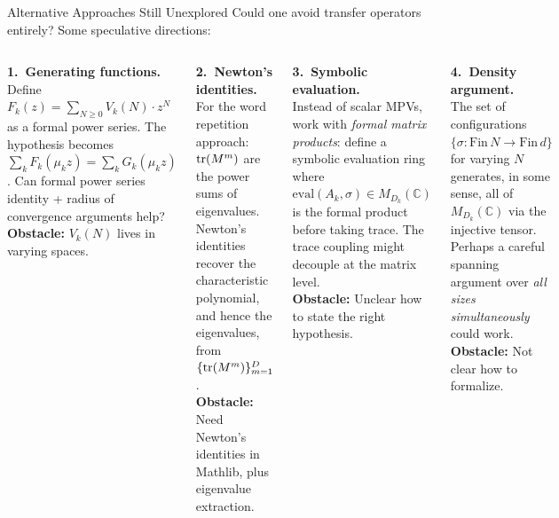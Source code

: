 \documentclass[aspectratio=169,10pt]{beamer}
\begin{document}
\begin{frame}{Alternative Approaches Still Unexplored}
\vspace{-0.3em}
{\small Could one avoid transfer operators entirely? Some speculative directions:}

\vspace{0.3em}
\begin{columns}[T]
{\small\textbf{\textcolor{amber}{1.\ Generating functions.}}}\\[0.1em]
{\scriptsize Define $F_k(z) = \sum_{N \geq 0} V_k(N) \cdot z^N$ as a formal power series. The hypothesis becomes $\sum_k F_k(\mu_k z) = \sum_k G_k(\mu_k z)$. Can formal power series identity + radius of convergence arguments help?\\[0.1em]
\textbf{Obstacle:} $V_k(N)$ lives in varying spaces.}

\vspace{0.3em}
{\small\textbf{\textcolor{amber}{2.\ Newton's identities.}}}\\[0.1em]
{\scriptsize For the word repetition approach: $\mathrm{tr}(M^m)$ are the power sums of eigenvalues. Newton's identities recover the characteristic polynomial, and hence the eigenvalues, from $\{\mathrm{tr}(M^m)\}_{m=1}^{D}$.\\[0.1em]
\textbf{Obstacle:} Need Newton's identities in Mathlib, plus eigenvalue extraction.}

{\small\textbf{\textcolor{amber}{3.\ Symbolic evaluation.}}}\\[0.1em]
{\scriptsize Instead of scalar MPVs, work with \emph{formal matrix products}: define a symbolic evaluation ring where $\mathrm{eval}(A_k, \sigma) \in M_{D_k}(\mathbb{C})$ is the formal product before taking trace. The trace coupling might decouple at the matrix level.\\[0.1em]
\textbf{Obstacle:} Unclear how to state the right hypothesis.}

\vspace{0.3em}
{\small\textbf{\textcolor{amber}{4.\ Density argument.}}}\\[0.1em]
{\scriptsize The set of configurations $\{\sigma : \mathrm{Fin}\,N \to \mathrm{Fin}\,d\}$ for varying $N$ generates, in some sense, all of $M_{D_k}(\mathbb{C})$ via the injective tensor. Perhaps a careful spanning argument over \emph{all sizes simultaneously} could work.\\[0.1em]
\textbf{Obstacle:} Not clear how to formalize.}
\end{columns}
\end{frame}
\end{document}
